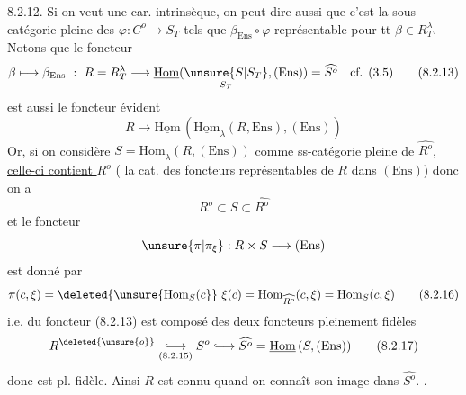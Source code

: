 8.2.12. Si on veut une car. intrinsèque, on peut dire aussi que
c'est la sous-catégorie pleine des $\varphi:C^o\longrightarrow S_T$ tels que
$\beta_{\mathrm{Ens}}\circ\varphi$ représentable pour tt $\beta\in R_T^\lambda$. Notons que le foncteur
\[
 \beta\longmapsto\beta_{\mathrm{Ens}}\ :\ R=R_T^\lambda\longrightarrow
 \underline{\mathrm{Hom}}(\underset{S_T}{\unsure{S|S_T}},(\mathrm{Ens}))=\widehat{S^o}\quad\text{cf. (3.5)}\tag*{(8.2.13)}
\]
est aussi le foncteur évident
\[
 R\longrightarrow\underline{\mathrm{Hom}}\,(\underline{\mathrm{Hom}}_\lambda(R,\mathrm{Ens}),(\mathrm{Ens}))\tag*{(8.2.14)}
\]
Or, si on considère $S=\underline{\mathrm{Hom}}_\lambda(R,(\mathrm{Ens}))$ comme ss-catégorie
pleine de $\widehat{R^o}$, \uline{celle-ci contient $R^o$} ( la cat. des foncteurs
représentables de $R$ dans $(\mathrm{Ens})$) donc on a 
\[
 R^o\subset S\subset\widehat{R^o}\tag*{(8.2.15)}
\]
 et le foncteur
\[
 \unsure{\pi|\pi_{\xi}}:R\times S\longrightarrow(\mathrm{Ens})
\]
est donné par
\[
 \pi(c,\xi)=\deleted{\unsure{\mathrm{Hom}_{S}(c}}\ \xi(c)=\mathrm{Hom}_{\widehat{R^o}}(c,\xi)=\mathrm{Hom}_{S}(c,\xi)\tag*{(8.2.16)}
\]
i.e.  du foncteur (8.2.13) est 
 composé des deux foncteurs pleinement fidèles
\[
 R^{\deleted{\unsure{o}}}\underset{(8.2.15)}{\lhook\joinrel\longrightarrow}S^o\lhook\joinrel\longrightarrow\widehat{S^o}=\underline{\mathrm{Hom}}\,(S,(\mathrm{Ens}))\tag*{(8.2.17)}
\]
donc est pl. fidèle. Ainsi $R$ est connu  quand
on connaît son image dans $\widehat{S^o}$. .

